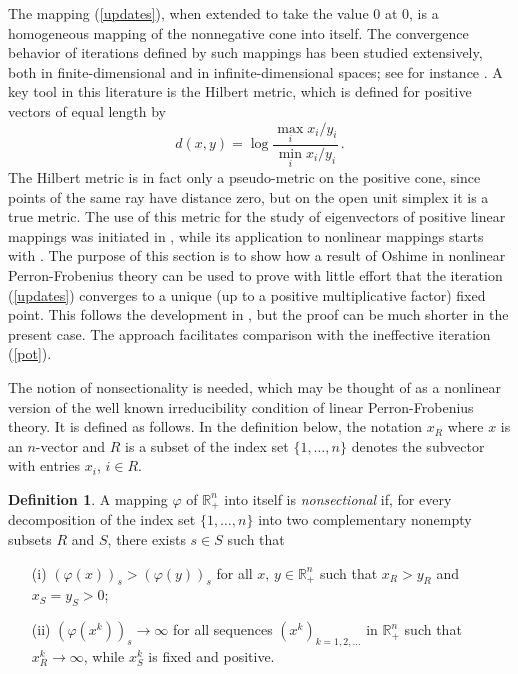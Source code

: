 \documentclass{article}
\newcommand{\mR}{\mathbb{R}}
\renewcommand{\phi}{\varphi}
\theoremstyle{definition}
\newtheorem{definition}[theorem]{Definition}
\begin{document}
The mapping (\ref{updates}), when extended to take the value 0 at 0, is a homogeneous mapping of the nonnegative cone into itself. The convergence behavior of iterations defined by such mappings has been studied extensively, both in finite-dimensional and in infinite-dimensional spaces; see for instance
\cite{SinkhornKnopp,Franklin,Borwein,Lemmens,Georgiou}. A key tool in this literature is the Hilbert metric, which is defined for positive vectors of equal length by
\begin{equation}
d(x,y) = \log \frac{\max_i x_i/y_i}{\min_i x_i/y_i}\,.
\end{equation}
The Hilbert metric is in fact only a pseudo-metric on the positive cone, since points of the same ray have distance zero, but on the open
unit simplex it is a true metric. The use of this metric for the study of eigenvectors of positive linear mappings was initiated in
\cite{Birkhoff}, while its application to nonlinear mappings starts with \cite{Bushell}. The purpose of this section is
to show how a result of Oshime \cite{Oshime} in nonlinear Perron-Frobenius theory can be used to prove with little effort that the iteration (\ref{updates}) converges to a unique (up to a positive multiplicative factor) fixed point. This follows the development in \cite{PSW1}, but the proof can be much shorter in the present case. The approach facilitates comparison with the ineffective iteration (\ref{pot}).

The notion of nonsectionality is needed, which may be thought of as a nonlinear version of the well known irreducibility condition of linear Perron-Frobenius theory. It is defined as follows. In the definition below, the notation $x_R$ where $x$ is an $n$-vector and $R$ is a subset of the index set $\{1,\dots,n\}$ denotes the subvector with entries $x_i$, $i \in R$.

\begin{definition} \label{nonsect} \cite{Oshime}
A mapping $\phi$ of $\mR^n_+$ into itself is \emph{nonsectional} if, for
every decomposition of the index set $\{1,\dots,n\}$ into two complementary nonempty
subsets $R$ and $S$, there exists $s \in S$ such that
\begin{itemize}
\item[(i)] $(\phi(x))_s > (\phi(y))_s$ for all $x,\,y \in \mR^n_+$ such that
$x_R > y_R$ and $x_S=y_S>0$;
\item[(ii)] $(\phi(x^k))_s \rightarrow \infty$ for all sequences $(x^k)_{k=1,2,\dots}$
in $\mR^n_+$ such that $x^k_R \rightarrow \infty$, while $x^k_S$ is fixed and positive.
\end{itemize}
\end{definition}
\end{document}
